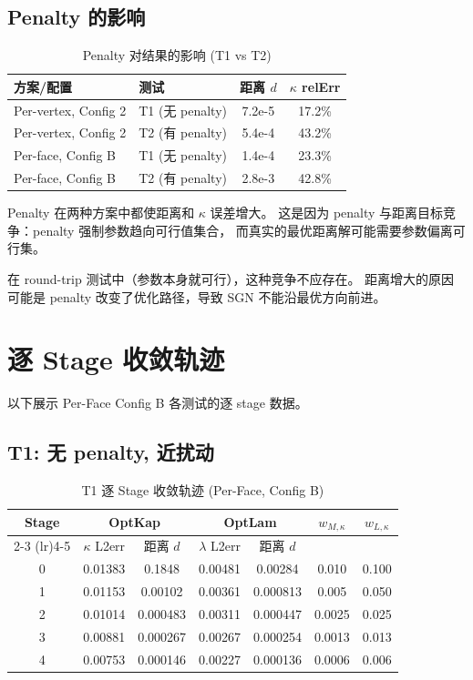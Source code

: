 \documentclass[12pt,a4paper]{article}
\begin{document}
\subsection{Penalty 的影响}

\begin{table}[H]
\centering
\caption{Penalty 对结果的影响 (T1 vs T2)}
\begin{tabular}{llcc}
\toprule
方案/配置 & 测试 & 距离 $d$ & $\kappa$ relErr \\
\midrule
Per-vertex, Config 2 & T1 (无 penalty) & 7.2e-5 & 17.2\% \\
Per-vertex, Config 2 & T2 (有 penalty) & 5.4e-4 & 43.2\% \\
\midrule
Per-face, Config B & T1 (无 penalty) & 1.4e-4 & 23.3\% \\
Per-face, Config B & T2 (有 penalty) & 2.8e-3 & 42.8\% \\
\bottomrule
\end{tabular}
\end{table}

Penalty 在两种方案中都使距离和 $\kappa$ 误差增大。
这是因为 penalty 与距离目标竞争：penalty 强制参数趋向可行值集合，
而真实的最优距离解可能需要参数偏离可行集。

在 round-trip 测试中（参数本身就可行），这种竞争不应存在。
距离增大的原因可能是 penalty 改变了优化路径，导致 SGN 不能沿最优方向前进。

\section{逐 Stage 收敛轨迹}

以下展示 Per-Face Config B 各测试的逐 stage 数据。

\subsection{T1: 无 penalty, 近扰动}

\begin{table}[H]
\centering
\caption{T1 逐 Stage 收敛轨迹 (Per-Face, Config B)}
\begin{tabular}{ccccccc}
\toprule
Stage & \multicolumn{2}{c}{OptKap} & \multicolumn{2}{c}{OptLam} & $w_{M,\kappa}$ & $w_{L,\kappa}$ \\
\cmidrule(lr){2-3} \cmidrule(lr){4-5}
 & $\kappa$ L2err & 距离 $d$ & $\lambda$ L2err & 距离 $d$ & & \\
\midrule
0 & 0.01383 & 0.1848 & 0.00481 & 0.00284 & 0.010 & 0.100 \\
1 & 0.01153 & 0.00102 & 0.00361 & 0.000813 & 0.005 & 0.050 \\
2 & 0.01014 & 0.000483 & 0.00311 & 0.000447 & 0.0025 & 0.025 \\
3 & 0.00881 & 0.000267 & 0.00267 & 0.000254 & 0.0013 & 0.013 \\
4 & 0.00753 & 0.000146 & 0.00227 & 0.000136 & 0.0006 & 0.006 \\
\bottomrule
\end{tabular}
\end{table}
\end{document}
